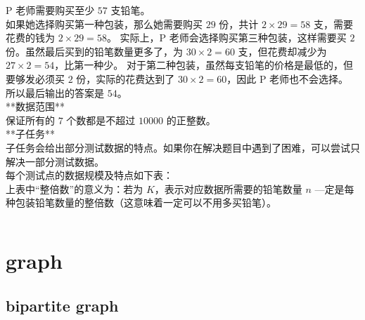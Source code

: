 \documentclass[12pt,twiside,a4paper]{ctexbook}
\numberwithin{chapter}{part}
\begin{document}
P 老师需要购买至少 $57$ 支铅笔。\\
如果她选择购买第一种包装，那么她需要购买 $29$ 份，共计 $2 \times 29 = 58$ 支，需要花费的钱为 $2 \times 29 = 58$。
实际上，P 老师会选择购买第三种包装，这样需要买 $2$ 份。虽然最后买到的铅笔数量更多了，为 $30 \times 2 = 60$ 支，但花费却减少为 $27 \times 2 = 54$，比第一种少。
对于第二种包装，虽然每支铅笔的价格是最低的，但要够发必须买 $2$ 份，实际的花费达到了 $30  \times 2 = 60$，因此 P 老师也不会选择。
所以最后输出的答案是 $54$。\\
**数据范围**\\
保证所有的 $7$ 个数都是不超过 $10000$ 的正整数。\\
**子任务**\\
子任务会给出部分测试数据的特点。如果你在解决题目中遇到了困难，可以尝试只解决一部分测试数据。\\
每个测试点的数据规模及特点如下表：\\
上表中“整倍数”的意义为：若为 $K$，表示对应数据所需要的铅笔数量 $n$ —定是每种包装铅笔数量的整倍数（这意味着一定可以不用多买铅笔）。
\begin{lstlisting}[language=C++,breaklines=true]

\end{lstlisting}

\chapter{graph}
\section{bipartite graph}
\end{document}
